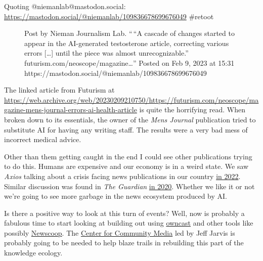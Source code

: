 Quoting @niemanlab@mastodon.social:
\url{https://mastodon.social/@niemanlab/109836678699676049} \#retoot

\begin{figure}
\centering
{}
\caption{Post by Nieman Journalism Lab. ``\,``A cascade of changes
started to appear in the AI-generated testosterone article, correcting
various errors {[}\ldots{]} until the piece was almost unrecognizable.''
futurism.com/neoscope/magazine\ldots'' Posted on Feb 9, 2023 at 15:31
https://mastodon.social/@niemanlab/109836678699676049}
\end{figure}

The linked article from Futurism at
\url{https://web.archive.org/web/20230209210750/https://futurism.com/neoscope/magazine-mens-journal-errors-ai-health-article}
is quite the horrifying read. When broken down to its essentials, the
owner of the \emph{Mens Journal} publication tried to substitute AI for
having any writing staff. The results were a very bad mess of incorrect
medical advice.

Other than them getting caught in the end I could see other publications
trying to do this. Humans are expensive and our economy is in a weird
state. We saw \emph{Axios} talking about a crisis facing news
publications in our country
\href{https://web.archive.org/web/20230129153829/https://www.axios.com/2022/07/04/local-newspapers-news-deserts}{in
2022}. Similar discussion was found in \emph{The Guardian}
\href{https://web.archive.org/web/20220625121318/https://www.theguardian.com/media/2020/apr/09/coronavirus-us-newspapers-impact}{in
2020}. Whether we like it or not we're going to see more garbage in the
news ecosystem produced by AI.

Is there a positive way to look at this turn of events? Well, now is
probably a fabulous time to start looking at building out using
\href{https://owncast.online}{owncast} and other tools like possibly
\href{https://www.sourcefabric.org/software/newscoop}{Newscoop}. The
\href{https://www.journalism.cuny.edu/centers/center-community-media/}{Center
for Community Media} led by Jeff Jarvis is probably going to be needed
to help blaze trails in rebuilding this part of the knowledge ecology.
